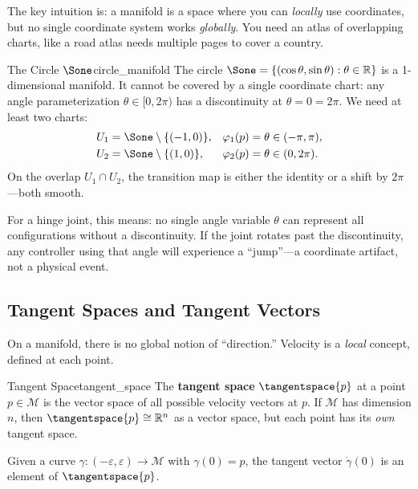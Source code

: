 \documentclass[12pt, openany]{book}
\theoremstyle{plain}
\newcommand{\manifold}{\mathcal{M}}
\newcommand{\Reals}{\mathbb{R}}
\begin{document}
The key intuition is: a manifold is a space where you can \emph{locally} use
coordinates, but no single coordinate system works \emph{globally}. You need
an atlas of overlapping charts, like a road atlas needs multiple pages to cover
a country.

\begin{example}{The Circle $\Sone$}{circle_manifold}
  The circle $\Sone = \{(\cos\theta, \sin\theta) : \theta \in \Reals\}$ is a
  1-dimensional manifold. It cannot be covered by a single coordinate chart:
  any angle parameterization $\theta \in [0, 2\pi)$ has a discontinuity
  at $\theta = 0 = 2\pi$. We need at least two charts:
  \begin{align}
    U_1 &= \Sone \setminus \{(-1, 0)\}, &
    \varphi_1(p) &= \theta \in (-\pi, \pi), \\
    U_2 &= \Sone \setminus \{(1, 0)\}, &
    \varphi_2(p) &= \theta \in (0, 2\pi).
  \end{align}
  On the overlap $U_1 \cap U_2$, the transition map is either the identity
  or a shift by $2\pi$---both smooth.

  For a hinge joint, this means: no single angle variable $\theta$ can
  represent all configurations without a discontinuity. If the joint rotates
  past the discontinuity, any controller using that angle will experience
  a ``jump''---a coordinate artifact, not a physical event.
\end{example}

\subsection{Tangent Spaces and Tangent Vectors}

On a manifold, there is no global notion of ``direction.'' Velocity is a
\emph{local} concept, defined at each point.

\begin{definition}{Tangent Space}{tangent_space}
  The \textbf{tangent space} $\tangentspace{p}$ at a point $p \in \manifold$
  is the vector space of all possible velocity vectors at $p$. If $\manifold$
  has dimension $n$, then $\tangentspace{p} \cong \Reals^n$ as a vector
  space, but each point has its \emph{own} tangent space.

  Given a curve $\gamma: (-\varepsilon, \varepsilon) \to \manifold$ with
  $\gamma(0) = p$, the tangent vector $\dot{\gamma}(0)$ is an element of
  $\tangentspace{p}$.
\end{definition}
\end{document}

